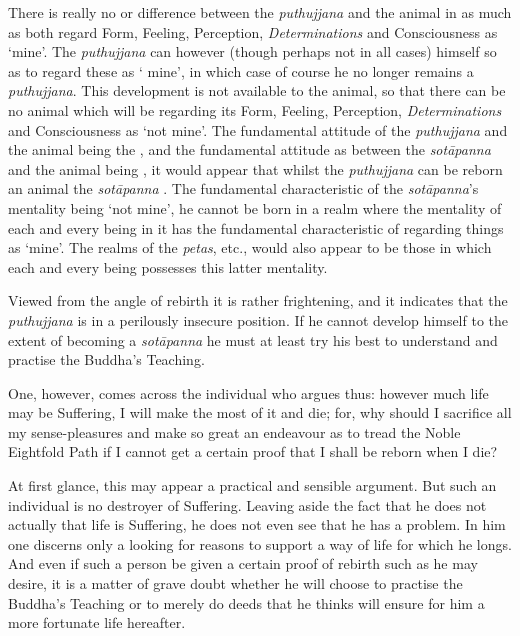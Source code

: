 There is really no  or  difference between the \emph{puthujjana} and the animal in as much as both regard Form, Feeling, Perception, \emph{Determinations} and Consciousness as `mine'. The \emph{puthujjana} can however (though perhaps not in all cases)  himself so as to regard these as ` mine', in which case of course he no longer remains a \emph{puthujjana}. This development is not available to the animal, so that there can be no animal which will be regarding its Form, Feeling, Perception, \emph{Determinations} and Consciousness as `not mine'. The fundamental attitude of the \emph{puthujjana} and the animal being the , and the fundamental attitude as between the \emph{sotāpanna} and the animal being , it would appear that whilst the \emph{puthujjana} can be reborn an animal the \emph{sotāpanna} . The fundamental characteristic of the \emph{sotāpanna}'s mentality being `not mine', he cannot be born in a realm where the mentality of each and every being in it has the fundamental characteristic of regarding things as `mine'. The realms of the \emph{petas}, etc., would also appear to be those in which each and every being possesses this latter mentality.

Viewed from the angle of rebirth it is rather frightening, and it indicates that the \emph{puthujjana} is in a perilously insecure position. If he cannot develop himself to the extent of becoming a \emph{sotāpanna} he must at least try his best to understand and practise the Buddha's Teaching.

One, however, comes across the individual who argues thus: however much life may be Suffering, I will make the most of it and die; for, why should I sacrifice all my sense-pleasures and make so great an endeavour as to tread the Noble Eightfold Path if I cannot get a certain proof that I shall be reborn when I die?

At first glance, this may appear a practical and sensible argument. But such an individual is no destroyer of Suffering. Leaving aside the fact that he does not actually  that life is Suffering, he does not even see that he has a problem. In him one discerns only a looking for reasons to support a way of life for which he longs. And even if such a person be given a certain proof of rebirth such as he may desire, it is a matter of grave doubt whether he will choose to practise the Buddha's Teaching or to merely do deeds that he thinks will ensure for him a more fortunate life hereafter.

